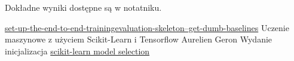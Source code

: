 \documentclass[12pt]{article}
\begin{document}
    Dokładne wyniki dostępne są w notatniku. 
    
    \newpage

    \begin{thebibliography}{9}
    \bibitem{} \href{http://karpathy.github.io/2019/04/25/recipe/#2-set-up-the-end-to-end-trainingevaluation-skeleton--get-dumb-baselines}{set-up-the-end-to-end-trainingevaluation-skeleton--get-dumb-baselines}
    \bibitem{} Uczenie maszynowe z użyciem Scikit-Learn i Tensorflow Aurelien Geron Wydanie inicjalizacja
    \bibitem{} \href{https://scikit-learn.org/stable/model_selection.html#model-selection}{scikit-learn model selection}

\end{thebibliography}
    
\end{document}
